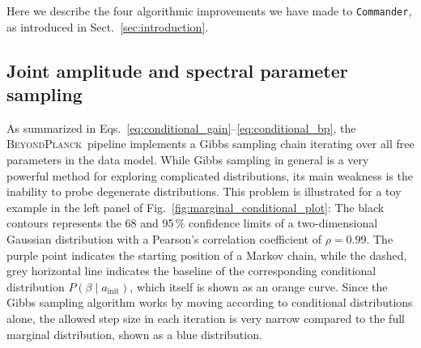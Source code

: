 \documentclass[twocolumn]{aa}
\def\commander{\texttt{Commander}}
\newcommand{\BP}{\textsc{BeyondPlanck}}
\begin{document}
Here we describe the four algorithmic improvements we have made to \commander,
as introduced in Sect.~\ref{sec:introduction}.


\subsection{Joint amplitude and spectral parameter sampling}
\label{subsec:gibbs}

As summarized in
Eqs.~\eqref{eq:conditional_gain}--\eqref{eq:conditional_bp}, the
\BP\ pipeline implements a Gibbs sampling chain iterating over all
free parameters in the data model. While Gibbs sampling in general is
a very powerful method for exploring complicated distributions, its
main weakness is the inability to probe degenerate distributions. This
problem is illustrated for a toy example in the left panel of
Fig.~\ref{fig:marginal_conditional_plot}: The black contours
represents the 68 and 95\,\% confidence limits of a two-dimensional
Gaussian distribution with a Pearson's correlation coefficient of
$\rho=0.99$. The purple point indicates the starting position of a
Markov chain, while the dashed, grey horizontal line indicates the baseline
of the corresponding conditional distribution
$P(\beta\mid a_{\mathrm{init}})$, which itself is shown as an orange
curve. Since the Gibbs sampling algorithm works by moving according to
conditional distributions alone, the allowed step size in each
iteration is very narrow compared to the full marginal distribution,
shown as a blue distribution.
\end{document}
